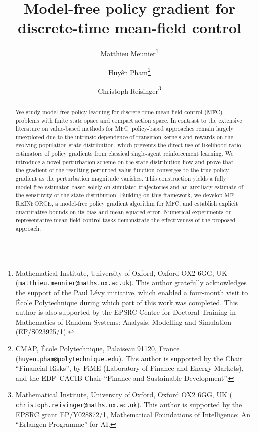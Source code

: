 \documentclass[11pt]{article}
\numberwithin{equation}{section}
\theoremstyle{definition}
\theoremstyle{remark}
\begin{document}
\title{Model-free policy gradient for discrete-time mean-field control} 
 


\author{
Matthieu Meunier\thanks{Mathematical Institute, University of Oxford, Oxford OX2 6GG, UK ({\tt matthieu.meunier@maths.ox.ac.uk}). This author gratefully acknowledges the support of the Paul Lévy initiative, which enabled a four-month visit to École Polytechnique  during which part of this work was completed. This author is also supported by the EPSRC Centre for Doctoral
Training in Mathematics of Random Systems: Analysis, Modelling and Simulation (EP/S023925/1).
} 
\and
Huyên Pham\thanks{CMAP, École Polytechnique, Palaiseau 91120, France ({\tt huyen.pham@polytechnique.edu}). 
This author is supported by the Chair ``Financial Risks'', by FiME (Laboratory of Finance and Energy Markets), and the EDF–CACIB Chair ``Finance and Sustainable Development''.
}
\and
Christoph Reisinger\thanks{Mathematical Institute, University of Oxford, Oxford OX2 6GG, UK ({\tt  
christoph.reisinger@maths.ox.ac.uk}).
This author is supported by the EPSRC grant EP/Y028872/1, Mathematical Foundations of Intelligence: An ``Erlangen Programme'' for AI.
} 
}


\date{}
%
%
\maketitle




\begin{abstract}%
We study model-free policy learning for discrete-time mean-field control (MFC) problems
with finite state space and compact action space.
In contrast to the extensive literature on 
value-based methods for MFC, policy-based approaches remain largely unexplored due to the intrinsic dependence of transition kernels and rewards on the evolving population state distribution, which
prevents the direct use of likelihood-ratio estimators of policy gradients from classical single-agent reinforcement learning.
We introduce a novel perturbation scheme on the state-distribution flow and prove that the gradient of the resulting perturbed value function converges to the true policy gradient as the perturbation magnitude vanishes.
This construction yields  a fully model-free estimator based solely on simulated trajectories and an auxiliary estimate of the sensitivity of the state distribution. 
Building on this framework, we develop MF-REINFORCE, a model-free policy gradient algorithm for MFC, and establish  explicit quantitative bounds on its bias and mean-squared error. 
Numerical expe\-riments on representative mean-field control tasks demonstrate the effectiveness of the proposed approach.  \end{abstract}
\end{document}
